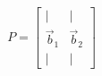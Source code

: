 \documentclass[preview]{standalone}
\begin{document}
\begin{align*}
P=\begin{bmatrix}|&|\\ \vec b_1&\vec b_2\\ |&|\end{bmatrix}
\end{align*}
\end{document}
